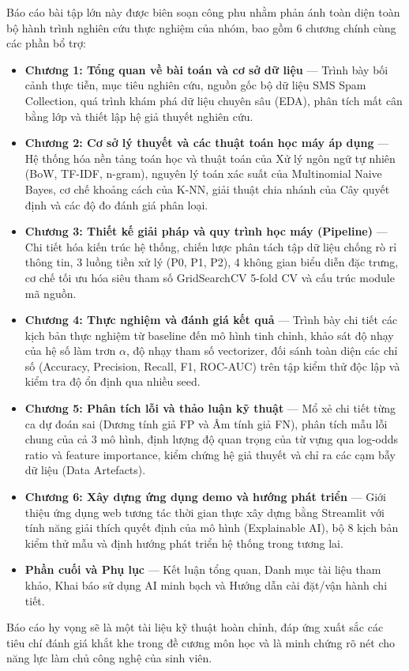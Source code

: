 Báo cáo bài tập lớn này được biên soạn công phu nhằm phản ánh toàn diện toàn bộ hành trình nghiên cứu thực nghiệm của nhóm, bao gồm 6 chương chính cùng các phần bổ trợ:
\begin{itemize}
    \item \textbf{Chương 1: Tổng quan về bài toán và cơ sở dữ liệu} --- Trình bày bối cảnh thực tiễn, mục tiêu nghiên cứu, nguồn gốc bộ dữ liệu SMS Spam Collection, quá trình khám phá dữ liệu chuyên sâu (EDA), phân tích mất cân bằng lớp và thiết lập hệ giả thuyết nghiên cứu.
    \item \textbf{Chương 2: Cơ sở lý thuyết và các thuật toán học máy áp dụng} --- Hệ thống hóa nền tảng toán học và thuật toán của Xử lý ngôn ngữ tự nhiên (BoW, TF-IDF, n-gram), nguyên lý toán xác suất của Multinomial Naive Bayes, cơ chế khoảng cách của K-NN, giải thuật chia nhánh của Cây quyết định và các độ đo đánh giá phân loại.
    \item \textbf{Chương 3: Thiết kế giải pháp và quy trình học máy (Pipeline)} --- Chi tiết hóa kiến trúc hệ thống, chiến lược phân tách tập dữ liệu chống rò rỉ thông tin, 3 luồng tiền xử lý (P0, P1, P2), 4 không gian biểu diễn đặc trưng, cơ chế tối ưu hóa siêu tham số GridSearchCV 5-fold CV và cấu trúc module mã nguồn.
    \item \textbf{Chương 4: Thực nghiệm và đánh giá kết quả} --- Trình bày chi tiết các kịch bản thực nghiệm từ baseline đến mô hình tinh chỉnh, khảo sát độ nhạy của hệ số làm trơn $\alpha$, độ nhạy tham số vectorizer, đối sánh toàn diện các chỉ số (Accuracy, Precision, Recall, F1, ROC-AUC) trên tập kiểm thử độc lập và kiểm tra độ ổn định qua nhiều seed.
    \item \textbf{Chương 5: Phân tích lỗi và thảo luận kỹ thuật} --- Mổ xẻ chi tiết từng ca dự đoán sai (Dương tính giả FP và Âm tính giả FN), phân tích mẫu lỗi chung của cả 3 mô hình, định lượng độ quan trọng của từ vựng qua log-odds ratio và feature importance, kiểm chứng hệ giả thuyết và chỉ ra các cạm bẫy dữ liệu (Data Artefacts).
    \item \textbf{Chương 6: Xây dựng ứng dụng demo và hướng phát triển} --- Giới thiệu ứng dụng web tương tác thời gian thực xây dựng bằng Streamlit với tính năng giải thích quyết định của mô hình (Explainable AI), bộ 8 kịch bản kiểm thử mẫu và định hướng phát triển hệ thống trong tương lai.
    \item \textbf{Phần cuối và Phụ lục} --- Kết luận tổng quan, Danh mục tài liệu tham khảo, Khai báo sử dụng AI minh bạch và Hướng dẫn cài đặt/vận hành chi tiết.
\end{itemize}

Báo cáo hy vọng sẽ là một tài liệu kỹ thuật hoàn chỉnh, đáp ứng xuất sắc các tiêu chí đánh giá khắt khe trong đề cương môn học và là minh chứng rõ nét cho năng lực làm chủ công nghệ của sinh viên.